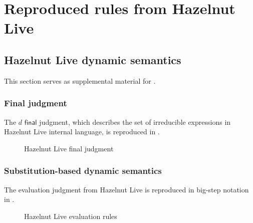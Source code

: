 \chapter{Reproduced rules from Hazelnut Live}
\label{chap:reproduced-hazelnut-live-rules}

\section{Hazelnut Live dynamic semantics}
\label{sec:hazelnut-live-dynamics}

This section serves as supplemental material for .

\subsection{Final judgment}
\label{sec:hazelnut-live-final-judgment}

The $d\textsf{ final}$ judgment, which describes the set of irreducible expressions in Hazelnut Live internal language, is reproduced in .

\begin{figure}
  \centering
  \begin{mdframed}
    \begin{singlespace}
      
    \end{singlespace}
  \end{mdframed}
  \caption{Hazelnut Live \textsf{final} judgment}
  \label{fig:hazelnut-live-final}
\end{figure}

\subsection{Substitution-based dynamic semantics}
\label{sec:hazelnut-live-evaluation}

The evaluation judgment from Hazelnut Live is reproduced in big-step notation in .

\begin{figure}
  \centering
  \begin{mdframed}
    \begin{singlespace}
      
    \end{singlespace}
  \end{mdframed}
  \caption{Hazelnut Live evaluation rules}
  \label{fig:hazelnut-live-evaluation}
\end{figure}

